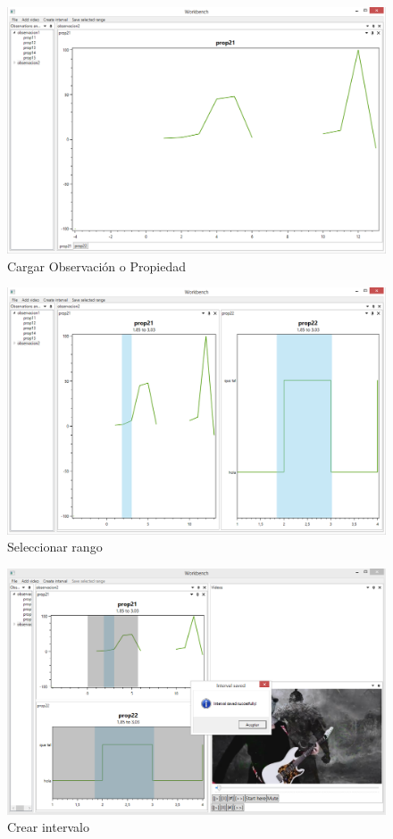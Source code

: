 \begin{figure}[H]
\centering
\includegraphics[width=0.9\linewidth]{./Figures/Capturas/CargarObservacionPropiedad.PNG}
\caption{Cargar Observaci\'on o Propiedad}
\label{fig:CargarObservacionPropiedad}
\end{figure}

\begin{figure}[H]
\centering
\includegraphics[width=0.9\linewidth]{./Figures/Capturas/SeleccionRango.PNG}
\caption{Seleccionar rango}
\label{fig:SeleccionarRango}
\end{figure}

\begin{figure}[H]
\centering
\includegraphics[width=0.9\linewidth]{./Figures/Capturas/IntervaloCreado.PNG}
\caption{Crear intervalo}
\label{fig:CrearIntervalo}
\end{figure}

